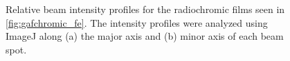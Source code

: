 \begin{figure}
    \centering
    \caption{ Relative beam intensity profiles for the radiochromic films seen in \autoref{fig:gafchromic_fe}. The intensity profiles were analyzed using ImageJ along (a) the major axis and (b) minor axis of each beam spot. }
     \label{fig:gafchromic_fe_profiles}
\end{figure}





